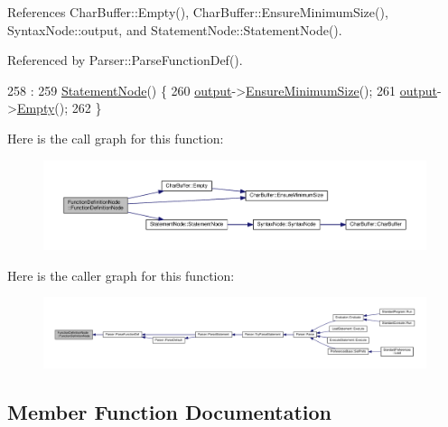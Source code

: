 References Char\+Buffer\+::\+Empty(), Char\+Buffer\+::\+Ensure\+Minimum\+Size(), Syntax\+Node\+::output, and Statement\+Node\+::\+Statement\+Node().



Referenced by Parser\+::\+Parse\+Function\+Def().


\begin{DoxyCode}
258                                                :
259     \hyperlink{classStatementNode_a586026d6009a39d087792d621de86360}{StatementNode}() \{
260     \hyperlink{classSyntaxNode_a1180628cbe3fce43930cee0df5a9ce5c}{output}->\hyperlink{classCharBuffer_ae742439a2d5d5a0ad64411dcbf4604c8}{EnsureMinimumSize}();
261     \hyperlink{classSyntaxNode_a1180628cbe3fce43930cee0df5a9ce5c}{output}->\hyperlink{classCharBuffer_abe39d3fd7d8b9c8ec343af2cae7adc96}{Empty}();
262 \}
\end{DoxyCode}


Here is the call graph for this function\+:\nopagebreak
\begin{figure}[H]
\begin{center}
\leavevmode
\includegraphics[width=350pt]{classFunctionDefinitionNode_a1ecb6319492be964ad5089739cf65d63_cgraph}
\end{center}
\end{figure}




Here is the caller graph for this function\+:\nopagebreak
\begin{figure}[H]
\begin{center}
\leavevmode
\includegraphics[width=350pt]{classFunctionDefinitionNode_a1ecb6319492be964ad5089739cf65d63_icgraph}
\end{center}
\end{figure}




\subsection{Member Function Documentation}

